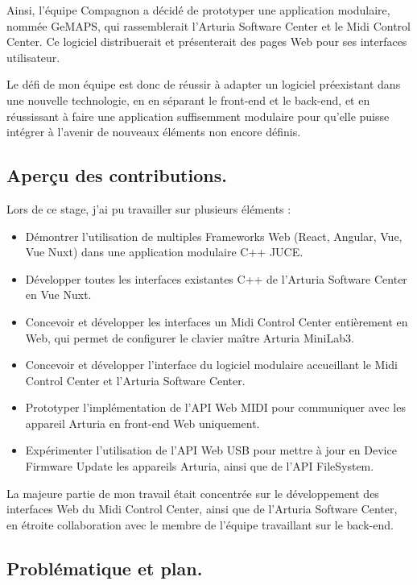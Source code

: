 \documentclass[francais]{rapportPFE}  %
\begin{document}
Ainsi, l'équipe Compagnon a décidé de prototyper une application modulaire, nommée GeMAPS, qui rassemblerait l'Arturia Software Center et le Midi Control Center. Ce logiciel distribuerait et présenterait des pages Web pour ses interfaces utilisateur.

Le défi de mon équipe est donc de réussir à adapter un logiciel préexistant dans une nouvelle technologie, en en séparant le front-end et le back-end, et en réussissant à faire une application suffisemment modulaire pour qu'elle puisse intégrer à l'avenir de nouveaux éléments non encore définis.




\subsection{Aperçu des contributions.}
Lors de ce stage, j'ai pu travailler sur plusieurs éléments : 
\begin{itemize}
    \setlength\itemsep{0em}
    \item Démontrer l'utilisation de multiples Frameworks Web (React, Angular, Vue, Vue Nuxt) dans une application modulaire C++ JUCE.
    \item Développer toutes les interfaces existantes C++ de l'Arturia Software Center en Vue Nuxt.
    \item Concevoir et développer les interfaces un Midi Control Center entièrement en Web, qui permet de configurer le clavier maître Arturia MiniLab3.
    \item Concevoir et développer l'interface du logiciel modulaire accueillant le Midi Control Center et l'Arturia Software Center.
    \item Prototyper l'implémentation de l'API Web MIDI pour communiquer avec les appareil Arturia en front-end Web uniquement.
    \item Expérimenter l'utilisation de l'API Web USB pour mettre à jour en Device Firmware Update les appareils Arturia, ainsi que de l'API FileSystem.
\end{itemize}
La majeure partie de mon travail était concentrée sur le développement des interfaces Web du Midi Control Center, ainsi que de l'Arturia Software Center, en étroite collaboration avec le membre de l'équipe travaillant sur le back-end. 

\subsection{Problématique et plan.}
\end{document}
